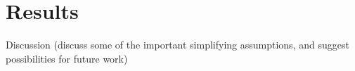 \section{Results}
\label{sec:discussion}

Discussion (discuss some of the important simplifying assumptions, and
suggest possibilities for future work)
